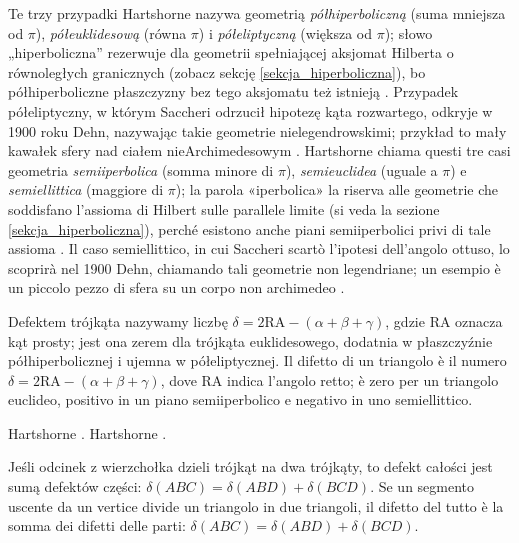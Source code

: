 Te trzy przypadki Hartshorne nazywa geometrią \emph{półhiperboliczną} (suma mniejsza od $\pi$), \emph{półeuklidesową} (równa $\pi$) i \emph{półeliptyczną} (większa od $\pi$); słowo „hiperboliczna'' rezerwuje dla geometrii spełniającej aksjomat Hilberta o równoległych granicznych (zobacz sekcję \ref{sekcja_hiperboliczna}), bo półhiperboliczne płaszczyzny bez tego aksjomatu też istnieją \cite[s. 311]{hartshorne_2000}. %
Przypadek półeliptyczny, w którym Saccheri odrzucił hipotezę kąta rozwartego, odkryje w 1900 roku Dehn, nazywając takie geometrie nielegendrowskimi; przykład to mały kawałek sfery nad ciałem nieArchimedesowym \cite[s. 311, 318]{hartshorne_2000}. %
Hartshorne chiama questi tre casi geometria \emph{semiiperbolica} (somma minore di $\pi$), \emph{semieuclidea} (uguale a $\pi$) e \emph{semiellittica} (maggiore di $\pi$); la parola «iperbolica» la riserva alle geometrie che soddisfano l'assioma di Hilbert sulle parallele limite (si veda la sezione \ref{sekcja_hiperboliczna}), perché esistono anche piani semiiperbolici privi di tale assioma \cite[p. 311]{hartshorne_2000}. %
Il caso semiellittico, in cui Saccheri scartò l'ipotesi dell'angolo ottuso, lo scoprirà nel 1900 Dehn, chiamando tali geometrie non legendriane; un esempio è un piccolo pezzo di sfera su un corpo non archimedeo \cite[p. 311, 318]{hartshorne_2000}. %
%

\begin{definition}
[defekt trójkąta] %
[difetto di un triangolo] %
	Defektem trójkąta nazywamy liczbę $\delta = 2\mathrm{RA} - (\alpha + \beta + \gamma)$, gdzie RA oznacza kąt prosty; jest ona zerem dla trójkąta euklidesowego, dodatnia w płaszczyźnie półhiperbolicznej i ujemna w półeliptycznej. %
	Il difetto di un triangolo è il numero $\delta = 2\mathrm{RA} - (\alpha + \beta + \gamma)$, dove RA indica l'angolo retto; è zero per un triangolo euclideo, positivo in un piano semiiperbolico e negativo in uno semiellittico. %
\end{definition}

Hartshorne \cite[s. 311]{hartshorne_2000}. %
Hartshorne \cite[p. 311]{hartshorne_2000}. %

\begin{proposition}
	Jeśli odcinek z wierzchołka dzieli trójkąt na dwa trójkąty, to defekt całości jest sumą defektów części: $\delta(ABC) = \delta(ABD) + \delta(BCD)$. %
	Se un segmento uscente da un vertice divide un triangolo in due triangoli, il difetto del tutto è la somma dei difetti delle parti: $\delta(ABC) = \delta(ABD) + \delta(BCD)$. %
\end{proposition}

